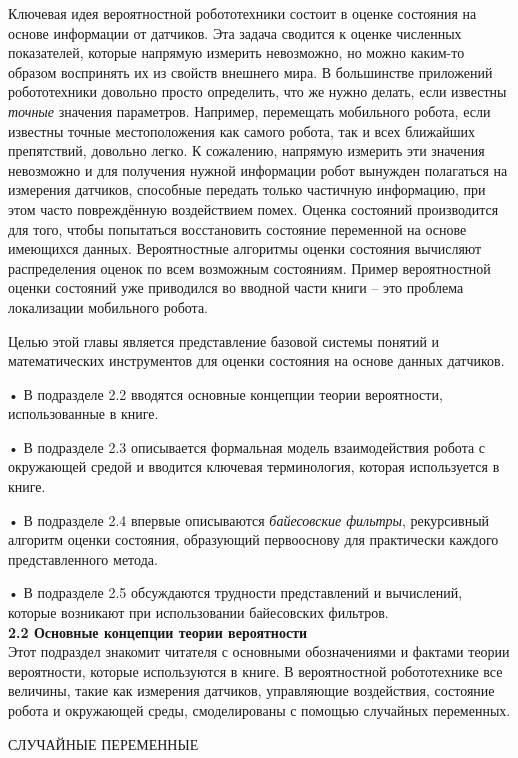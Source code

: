\documentclass[10pt,a4paper]{article}
\begin{document}
Ключевая идея вероятностной робототехники состоит в оценке состояния на основе информации от датчиков. Эта задача сводится к оценке численных показателей, которые напрямую измерить невозможно, но можно каким-то образом воспринять их из свойств внешнего мира. 
В большинстве приложений робототехники довольно просто определить, что же нужно делать, если известны \textit{точные} значения параметров. Например, перемещать мобильного робота, если известны точные местоположения как самого робота, так и всех ближайших препятствий, довольно легко. К сожалению, напрямую измерить эти значения невозможно и для получения нужной информации робот вынужден полагаться на измерения датчиков,  способные передать только частичную информацию, при этом часто  повреждённую воздействием помех.  Оценка состояний производится для того, чтобы попытаться восстановить состояние переменной на основе имеющихся данных. Вероятностные алгоритмы оценки состояния вычисляют распределения оценок по всем возможным состояниям. Пример вероятностной оценки состояний  уже приводился во вводной части книги – это проблема локализации мобильного робота.
 
Целью этой главы является представление базовой системы понятий и математических инструментов для оценки состояния на основе данных датчиков.

• В подразделе 2.2 вводятся основные концепции теории вероятности, использованные в книге.
 
• В подразделе 2.3 описывается формальная модель взаимодействия робота с окружающей средой и вводится ключевая терминология, которая используется в книге.
 
• В подразделе 2.4 впервые описываются \textit{байесовские фильтры}, рекурсивный алгоритм оценки состояния, образующий первооснову для практически каждого представленного метода.
 
• В подразделе 2.5 обсуждаются трудности представлений и вычислений, которые возникают при использовании байесовских фильтров.\\

\textbf{2.2 Основные концепции теории вероятности}\\

Этот подраздел знакомит читателя с основными обозначениями и фактами теории вероятности, которые используются в книге. 
В вероятностной робототехнике все величины, такие как измерения датчиков, управляющие воздействия, состояние робота и окружающей среды, смоделированы с помощью случайных переменных.

СЛУЧАЙНЫЕ ПЕРЕМЕННЫЕ
\end{document}
